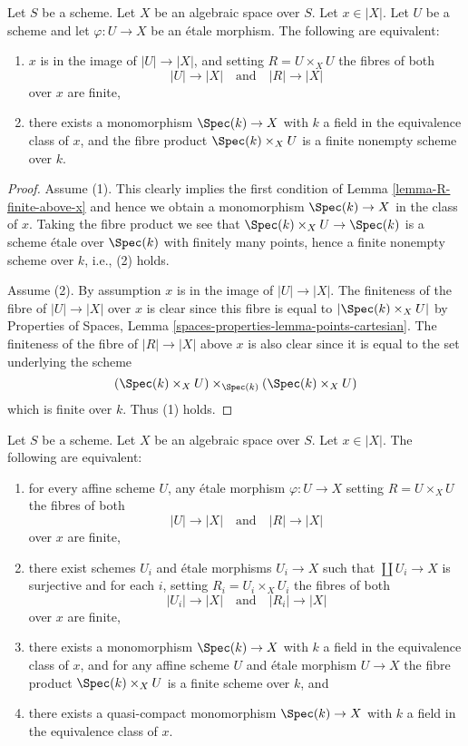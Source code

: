 \begin{lemma}
\label{lemma-weak-UR-finite-above-x}
Let $S$ be a scheme. Let $X$ be an algebraic space over $S$.
Let $x \in |X|$.
Let $U$ be a scheme and let $\varphi : U \to X$ be an \'etale morphism.
The following are equivalent:
\begin{enumerate}
\item $x$ is in the image of $|U| \to |X|$, and
setting $R = U \times_X U$ the fibres of both
$$
|U| \longrightarrow |X|
\quad\text{and}\quad
|R| \longrightarrow |X|
$$
over $x$ are finite,
\item there exists a monomorphism $\Spec(k) \to X$ with $k$ a field
in the equivalence class of $x$, and
the fibre product $\Spec(k) \times_X U$ is
a finite nonempty scheme over $k$.
\end{enumerate}
\end{lemma}

\begin{proof}
Assume (1). This clearly implies the first condition of
Lemma \ref{lemma-R-finite-above-x} and hence we obtain a monomorphism
$\Spec(k) \to X$ in the class of $x$. Taking the fibre product
we see that $\Spec(k) \times_X U \to \Spec(k)$ is a scheme
\'etale over $\Spec(k)$ with finitely many points, hence a finite
nonempty scheme over $k$, i.e., (2) holds.

\medskip\noindent
Assume (2). By assumption $x$ is in the image of
$|U| \to |X|$. The finiteness of the fibre of
$|U| \to |X|$ over $x$ is clear since this fibre is equal to
$|\Spec(k) \times_X U|$ by
Properties of Spaces,
Lemma \ref{spaces-properties-lemma-points-cartesian}.
The finiteness of the fibre of $|R| \to |X|$ above $x$ is also clear
since it is equal to the set underlying the scheme
$$
(\Spec(k) \times_X U) \times_{\Spec(k)} (\Spec(k) \times_X U)
$$
which is finite over $k$. Thus (1) holds.
\end{proof}

\begin{lemma}
\label{lemma-UR-finite-above-x}
Let $S$ be a scheme. Let $X$ be an algebraic space over $S$.
Let $x \in |X|$. The following are equivalent:
\begin{enumerate}
\item for every affine scheme $U$, any \'etale morphism
$\varphi : U \to X$ setting $R = U \times_X U$ the fibres of both
$$
|U| \longrightarrow |X|
\quad\text{and}\quad
|R| \longrightarrow |X|
$$
over $x$ are finite,
\item there exist schemes $U_i$ and \'etale morphisms
$U_i \to X$ such that $\coprod U_i \to X$ is surjective and for each
$i$, setting $R_i = U_i \times_X U_i$ the fibres of both
$$
|U_i| \longrightarrow |X|
\quad\text{and}\quad
|R_i| \longrightarrow |X|
$$
over $x$ are finite,
\item there exists a monomorphism $\Spec(k) \to X$ with $k$ a field
in the equivalence class of $x$, and for any affine scheme $U$ and \'etale
morphism $U \to X$ the fibre product $\Spec(k) \times_X U$ is
a finite scheme over $k$, and
\item there exists a quasi-compact monomorphism $\Spec(k) \to X$
with $k$ a field in the equivalence class of $x$.
\end{enumerate}
\end{lemma}

